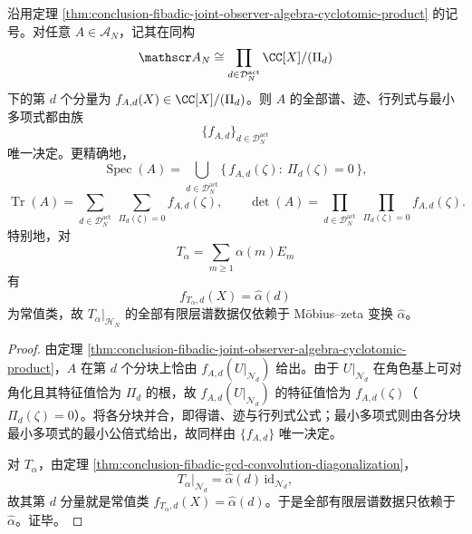 \begin{corollary}[有限层谱数据的块函数演算完备性]\label{cor:conclusion-fibadic-joint-observer-algebra-spectral-completeness}
沿用定理 \ref{thm:conclusion-fibadic-joint-observer-algebra-cyclotomic-product} 的记号。对任意 \(A\in\mathscr A_N\)，记其在同构
\[
\mathscr A_N
\cong
\prod_{d\in\mathcal D_N^{\mathrm{act}}}\CC[X]/(\Pi_d)
\]
下的第 \(d\) 个分量为 \(f_{A,d}(X)\in \CC[X]/(\Pi_d)\)。则 \(A\) 的全部谱、迹、行列式与最小多项式都由族
\[
\{f_{A,d}\}_{d\in\mathcal D_N^{\mathrm{act}}}
\]
唯一决定。更精确地，
\[
\operatorname{Spec}(A)
=
\bigcup_{d\in\mathcal D_N^{\mathrm{act}}}
\{\,f_{A,d}(\zeta):\ \Pi_d(\zeta)=0\,\},
\]
\[
\operatorname{Tr}(A)
=
\sum_{d\in\mathcal D_N^{\mathrm{act}}}\ \sum_{\Pi_d(\zeta)=0} f_{A,d}(\zeta),
\qquad
\det(A)
=
\prod_{d\in\mathcal D_N^{\mathrm{act}}}\ \prod_{\Pi_d(\zeta)=0} f_{A,d}(\zeta).
\]
特别地，对
\[
T_\alpha=\sum_{m\ge 1}\alpha(m)E_m
\]
有
\[
f_{T_\alpha,d}(X)=\widehat\alpha(d)
\]
为常值类，故 \(T_\alpha|_{\mathcal H_N}\) 的全部有限层谱数据仅依赖于 Möbius--zeta 变换 \(\widehat\alpha\)。
\end{corollary}
\begin{proof}
由定理 \ref{thm:conclusion-fibadic-joint-observer-algebra-cyclotomic-product}，\(A\) 在第 \(d\) 个分块上恰由 \(f_{A,d}(U|_{\mathcal N_d})\) 给出。由于 \(U|_{\mathcal N_d}\) 在角色基上可对角化且其特征值恰为 \(\Pi_d\) 的根，故 \(f_{A,d}(U|_{\mathcal N_d})\) 的特征值恰为 \(f_{A,d}(\zeta)\)（\(\Pi_d(\zeta)=0\)）。将各分块并合，即得谱、迹与行列式公式；最小多项式则由各分块最小多项式的最小公倍式给出，故同样由 \(\{f_{A,d}\}\) 唯一决定。

对 \(T_\alpha\)，由定理 \ref{thm:conclusion-fibadic-gcd-convolution-diagonalization}，
\[
T_\alpha|_{\mathcal N_d}=\widehat\alpha(d)\,\mathrm{id}_{\mathcal N_d},
\]
故其第 \(d\) 分量就是常值类 \(f_{T_\alpha,d}(X)=\widehat\alpha(d)\)。于是全部有限层谱数据只依赖于 \(\widehat\alpha\)。证毕。
\end{proof}

